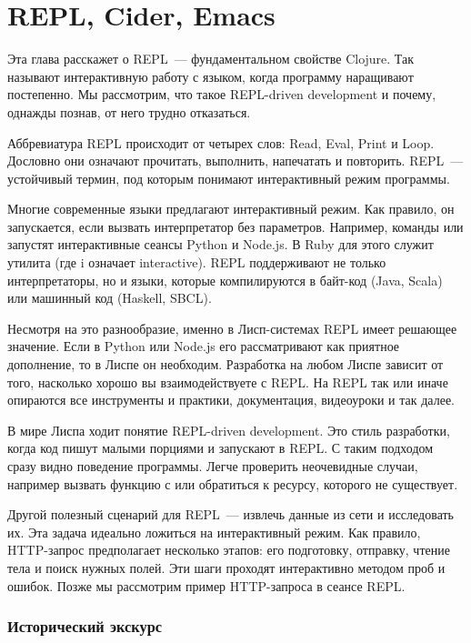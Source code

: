 \chapter{REPL, Cider, Emacs}

\begin{teaser}
Эта глава расскажет о REPL~--- фундаментальном свойстве Clojure. Так называют интерактивную работу с языком, когда программу наращивают постепенно. Мы рассмотрим, что такое REPL-driven development и почему, однажды познав, от него трудно отказаться.
\end{teaser}

Аббревиатура REPL происходит от четырех слов: Read, Eval, Print и Loop. Дословно они означают прочитать, выполнить, напечатать и повторить. REPL~--- устойчивый термин, под которым понимают интерактивный режим программы.

Многие современные языки предлагают интерактивный режим. Как правило, он запускается, если вызвать интерпретатор без параметров. Например, команды  или  запустят интерактивные сеансы Python и Node.js. В Ruby для этого служит утилита  (где i означает interactive). REPL поддерживают не только интерпретаторы, но и языки, которые компилируются в байт-код (Java, Scala) или машинный код (Haskell, SBCL).

Несмотря на это разнообразие, именно в Лисп-системах REPL имеет решающее значение. Если в Python или Node.js его рассматривают как приятное дополнение, то в Лиспе он необходим. Разработка на любом Лиспе зависит от того, насколько хорошо вы взаимодействуете с REPL. На REPL так или иначе опираются все инструменты и практики, документация, видеоуроки и так далее.

В мире Лиспа ходит понятие REPL-driven development. Это стиль разработки, когда код пишут малыми порциями и запускают в REPL. С таким подходом сразу видно поведение программы. Легче проверить неочевидные случаи, например вызвать функцию с  или обратиться к ресурсу, которого не существует.

Другой полезный сценарий для REPL~--- извлечь данные из сети и исследовать их. Эта задача идеально ложиться на интерактивный режим. Как правило, HTTP-запрос предполагает несколько этапов: его подготовку, отправку, чтение тела и поиск нужных полей. Эти шаги проходят интерактивно методом проб и ошибок. Позже мы рассмотрим пример HTTP-запроса в сеансе REPL.

\subsection{Исторический экскурс}

